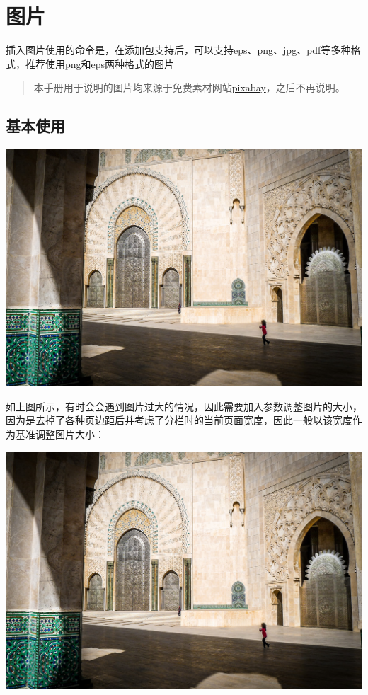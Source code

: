 \section{图片}\label{sec:graphics}
    插入图片使用的命令是，在添加包支持后，可以支持eps、png、jpg、pdf等多种格式，推荐使用png和eps两种格式的图片

    \begin{quotation}
        本手册用于说明的图片均来源于免费素材网站\href{https://pixabay.com/zh/}{pixabay}，之后不再说明。        
    \end{quotation}
    \subsection{基本使用}
    \begin{texshow}
        \includegraphics{contents/fig/mosque.jpg}
    \end{texshow}
    
    如上图所示，有时会会遇到图片过大的情况，因此需要加入参数调整图片的大小，因为是去掉了各种页边距后并考虑了分栏时的当前页面宽度，因此一般以该宽度作为基准调整图片大小：
    \begin{texshow}
        \includegraphics[width=0.5\columnwidth]{contents/fig/mosque.jpg} %
    \end{texshow}

